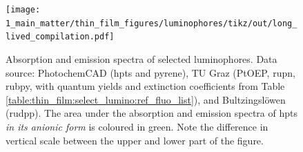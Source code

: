 \begin{figure}
	\centering
	\texttt{[image: 1\_main\_matter/thin\_film\_figures/luminophores/tikz/out/long\_lived\_compilation.pdf]}
	\caption[Absorption and emission spectra of selected luminophores.]{Absorption and emission spectra of selected luminophores. Data source: PhotochemCAD (\gls{hpts} and pyrene), TU Graz (PtOEP, \gls{rupn}, \gls{rubpy}, with quantum yields and extinction coefficients from Table \ref{table:thin_film:select_lumino:ref_fluo_list}), and Bultzingslöwen \etal{}\cite{bultzingslowen2002} (\gls{rudpp}). The area under the absorption and emission spectra of \gls{hpts} \emph{in its anionic form} is coloured in green. Note the difference in vertical scale between the upper and lower part of the figure.}
	\label{fig:thin_film:select_lumino:long_lived_compilation}
\end{figure}

